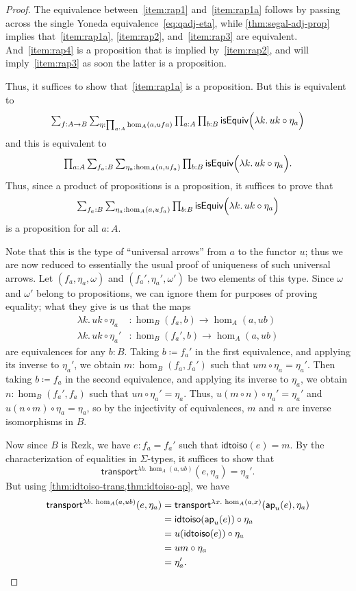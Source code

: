 \documentclass[12pt]{amsart}
\theoremstyle{plain}
\theoremstyle{definition}
\theoremstyle{remark}
\numberwithin{equation}{section}
\newcommand{\tprod}{\textstyle\prod}
\newcommand{\tsum}{\textstyle\sum}
\newcommand{\defeq}{\coloneqq}
\newcommand{\idtoiso}{\mathsf{idtoiso}}
\newcommand{\lam}[1]{\lambda #1.\,}
\newcommand{\isequiv}[1]{\mathsf{isEquiv}\Parens{#1}}
\newcommand{\transport}[3]{\mathsf{transport}^{#1}(#2,#3)}%
\newcommand{\ap}{\mathsf{ap}}                             %
\newcommand{\Parens}[1]{\Bigl(#1\Bigr)}
\begin{document}
\begin{proof}
  The equivalence between~\ref{item:rap1} and~\ref{item:rap1a} follows by passing across the single Yoneda equivalence~\eqref{eq:qadj-eta}, while \cref{thm:segal-adj-prop} implies that~\ref{item:rap1a}, \ref{item:rap2}, and~\ref{item:rap3} are equivalent.
  And~\ref{item:rap4} is a proposition that is implied by~\ref{item:rap2}, and will imply~\ref{item:rap3} as soon the latter is a proposition.
  
  Thus, it suffices to show that~\ref{item:rap1a} is a proposition.
  But this is equivalent to
  \[ \tsum_{f:A\to B} \tsum_{\eta:\prod_{a:A} \hom_A(a,ufa)} \tprod_{a:A} \tprod_{b:B} \isequiv{\lam{k} u k \circ \eta_a}\]
  and this is equivalent to
  \[ \tprod_{a:A} \tsum_{f_a:B} \tsum_{\eta_a:\hom_A(a,uf_a)} \tprod_{b:B} \isequiv{\lam{k} u k \circ \eta_a}.\]
  Thus, since a product of propositions is a proposition, it suffices to prove that 
  \[ \tsum_{f_a:B} \tsum_{\eta_a:\hom_A(a,uf_a)} \tprod_{b:B} \isequiv{\lam{k} u k \circ \eta_a}\]
  is a proposition for all $a:A$.

  Note that this is the type of ``universal arrows'' from $a$ to the functor $u$; thus we are now reduced to essentially the usual proof of uniqueness of such universal arrows.
  Let $(f_a,\eta_a,\omega)$ and $(f_a',\eta_a',\omega')$ be two elements of this type.
  Since $\omega$ and $\omega'$ belong to propositions, we can ignore them for purposes of proving equality; what they give is us that the maps
  \begin{align*}
    \lam{k} u k \circ \eta_a &: \hom_B(f_a,b) \to \hom_A(a,ub)\\
    \lam{k} u k \circ \eta_a' &: \hom_B(f_a',b) \to \hom_A(a,ub)
  \end{align*}
  are equivalences for any $b:B$.
  Taking $b\defeq f_a'$ in the first equivalence, and applying its inverse to $\eta_a'$, we obtain $m:\hom_B(f_a,f_a')$ such that $um\circ\eta_a = \eta_a'$.
  Then taking $b\defeq f_a$ in the second equivalence, and applying its inverse to $\eta_a$, we obtain $n:\hom_B(f_a',f_a)$ such that $un\circ\eta_a'= \eta_a$.
  Thus, $u(m\circ n) \circ\eta_a' = \eta_a'$ and $u(n\circ m) \circ \eta_a = \eta_a$, so by the injectivity of equivalences, $m$ and $n$ are inverse isomorphisms in $B$.

  Now since $B$ is Rezk, we have $e:f_a=f_a'$ such that $\idtoiso(e) = m$.
  By the characterization of equalities in $\Sigma$-types, it suffices to show that
  \[\transport{\lam{b} \hom_A(a,ub)}{e}{\eta_a} = \eta_a'.\]
  But using \cref{thm:idtoiso-trans,thm:idtoiso-ap}, we have
  \begin{align*}
    \transport{\lam{b} \hom_A(a,ub)}{e}{\eta_a}
    &= \transport{\lam{x} \hom_A(a,x)}{\ap_u(e)}{\eta_a}\\
    &= \idtoiso(\ap_u(e)) \circ \eta_a\\
    &= u(\idtoiso(e)) \circ \eta_a\\
    &= um \circ \eta_a\\
    &= \eta_a'.\qedhere
  \end{align*}
\end{proof}
\end{document}

